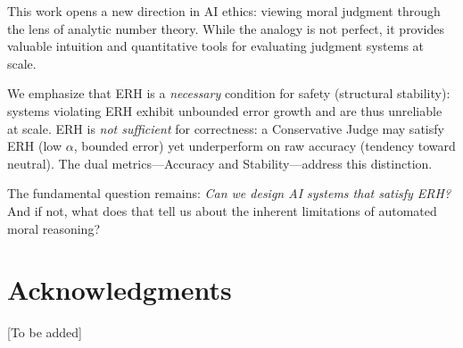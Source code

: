 \documentclass[12pt,a4paper]{article}
\theoremstyle{definition}
\theoremstyle{remark}
\begin{document}
This work opens a new direction in AI ethics: viewing moral judgment through the lens of analytic number theory. While the analogy is not perfect, it provides valuable intuition and quantitative tools for evaluating judgment systems at scale.

We emphasize that ERH is a \emph{necessary} condition for safety (structural stability): systems violating ERH exhibit unbounded error growth and are thus unreliable at scale. ERH is \emph{not sufficient} for correctness: a Conservative Judge may satisfy ERH (low $\alpha$, bounded error) yet underperform on raw accuracy (tendency toward neutral). The dual metrics---Accuracy and Stability---address this distinction.

The fundamental question remains: \emph{Can we design AI systems that satisfy ERH?} And if not, what does that tell us about the inherent limitations of automated moral reasoning?

\section*{Acknowledgments}

[To be added]



\end{document}

